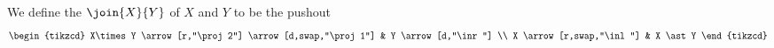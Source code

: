 \begin{defn}
We define the  $\join{X}{Y}$ of $X$ and $Y$ to be the pushout 
\begin{equation*}
\begin{tikzcd}
X\times Y \arrow[r,"\proj 2"] \arrow[d,swap,"\proj 1"] & Y \arrow[d,"\inr"] \\
X \arrow[r,swap,"\inl"] & X \ast Y 
\end{tikzcd}
\end{equation*}
\end{defn}

\begin{comment}
\begin{defn}
Let $X$ and $Y$ be types with base points $x_0$ and $y_0$, respectively.
We define the \define{wedge} $X\lor Y$ of $X$ and $Y$ to be the pushout
\begin{equation*}
\begin{tikzcd}[column sep=8em]
\bool \arrow[r,"{\ind{\bool}(\inl(x_0),\inr(y_0))}"] \arrow[d,swap,"\mathsf{const}_\ttt"] & X+Y \arrow[d,"\inr"] \\
\unit \arrow[r,swap,"\inl"] & X\lor Y
\end{tikzcd}
\end{equation*}
\end{defn}

\begin{defn}
Let $X$ and $Y$ be types with base points $x_0$ and $y_0$, respectively.
We define a map
\begin{equation*}
\mathsf{wedge\usc{}incl} : X \lor Y \to X\times Y.
\end{equation*}
as the unique map obtained from the commutative square
\begin{equation*}
\begin{tikzcd}[column sep=8em]
\bool \arrow[r,"{\ind{\bool}(\inl(x_0),\inr(y_0))}"] \arrow[d,swap,"\mathsf{const}_\ttt"] & X+Y \arrow[d,"{\ind{X+Y}(\lam{x}\pairr{x,y_0},\lam{y}\pairr{x_0,y})}"] \\
\unit \arrow[r,swap,"\lam{t}\pairr{x_0,y_0}"] & X\times Y.
\end{tikzcd}
\end{equation*}
\end{defn}

\begin{defn}
We define the \define{smash product} $X\wedge Y$ of $X$ and $Y$ to be the pushout
\begin{equation*}
\begin{tikzcd}[column sep=huge]
X\lor Y \arrow[r,"\mathsf{wedge\usc{}incl}"] \arrow[d,swap,"\mathsf{const}_\ttt"] & X\times Y \arrow[d,"\inr"] \\
\unit \arrow[r,swap,"\inl"] & X\wedge Y.
\end{tikzcd}
\end{equation*}
\end{defn}
\end{comment}

